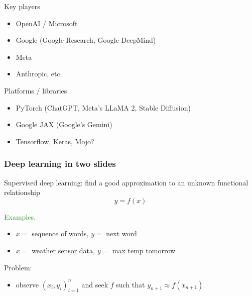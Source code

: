 \documentclass[
    xcolor={svgnames,dvipsnames},
    hyperref={colorlinks, citecolor=DeepPink4, linkcolor=DarkRed, urlcolor=DarkBlue}
    ]{beamer}  %
\newcommand{\Egs}{\textcolor{ForestGreen}{Examples. }}
\newcommand{\1}{\mathbbm 1}
\begin{document}
\begin{frame}
    
    Key players
    \begin{itemize}
        \item OpenAI / Microsoft 
        \vspace{0.5em}
        \item Google (Google Research, Google DeepMind)
        \vspace{0.5em}
        \item Meta
        \vspace{0.5em}
        \item Anthropic, etc.
    \end{itemize}

    Platforms / libraries

    \begin{itemize}
        \item PyTorch (ChatGPT, Meta's LLaMA 2,  Stable Diffusion)
        \vspace{0.5em}
        \item Google JAX (Google's Gemini)
        \vspace{0.5em}
        \item Tensorflow, Keras, Mojo?
    \end{itemize}

\end{frame}


\begin{frame}
    \frametitle{Deep learning in two slides}
    
    Supervised deep learning: find a good approximation to an unknown functional
    relationship
    \begin{equation*}
        y = f(x)
    \end{equation*}

    \Egs
    \begin{itemize}
        \item $x = $ sequence of words, $y = $ next word
        \vspace{0.5em}
        \item $x = $ weather sensor data, $y = $ max temp tomorrow
    \end{itemize}
        \vspace{0.5em}
        \vspace{0.5em}

    Problem:

    \begin{itemize}
        \item observe $(x_i, y_i)_{i=1}^n$ and seek $f$ such that $y_{n+1}
            \approx f(x_{n+1})$
    \end{itemize}


\end{frame}
\end{document}

